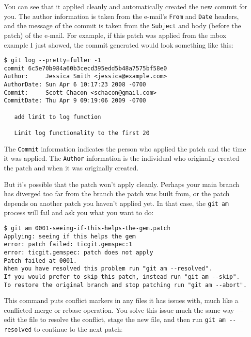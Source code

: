 \documentclass[a4paper]{book}
\begin{document}
You can see that it applied cleanly and automatically created the new commit for you. The author information is taken from the e-mail's \texttt{From} and \texttt{Date} headers, and the message of the commit is taken from the \texttt{Subject} and body (before the patch) of the e-mail. For example, if this patch was applied from the mbox example I just showed, the commit generated would look something like this:

\begin{shaded}\begin{verbatim}
$ git log --pretty=fuller -1
commit 6c5e70b984a60b3cecd395edd5b48a7575bf58e0
Author:     Jessica Smith <jessica@example.com>
AuthorDate: Sun Apr 6 10:17:23 2008 -0700
Commit:     Scott Chacon <schacon@gmail.com>
CommitDate: Thu Apr 9 09:19:06 2009 -0700

   add limit to log function

   Limit log functionality to the first 20
\end{verbatim}\end{shaded}

The \texttt{Commit} information indicates the person who applied the patch and the time it was applied. The \texttt{Author} information is the individual who originally created the patch and when it was originally created.

But it's possible that the patch won't apply cleanly. Perhaps your main branch has diverged too far from the branch the patch was built from, or the patch depends on another patch you haven't applied yet. In that case, the \texttt{git am} process will fail and ask you what you want to do:

\begin{shaded}\begin{verbatim}
$ git am 0001-seeing-if-this-helps-the-gem.patch
Applying: seeing if this helps the gem
error: patch failed: ticgit.gemspec:1
error: ticgit.gemspec: patch does not apply
Patch failed at 0001.
When you have resolved this problem run "git am --resolved".
If you would prefer to skip this patch, instead run "git am --skip".
To restore the original branch and stop patching run "git am --abort".
\end{verbatim}\end{shaded}

This command puts conflict markers in any files it has issues with, much like a conflicted merge or rebase operation. You solve this issue much the same way --- edit the file to resolve the conflict, stage the new file, and then run \texttt{git am -{}-resolved} to continue to the next patch:
\end{document}
